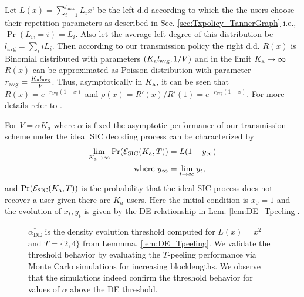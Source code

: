 
Let $L(x)=\sum_{i=1}^{l_{\max}} L_i x^i$ be the left d.d according to which the the users choose their repetition parameters as described in Sec. \ref{sec:Txpolicy_TannerGraph} i.e., $\Pr(L_{w}=i)=L_i$. Also let the average left degree of this distribution be $l_{\text{avg}}=\sum_i iL_i$. Then according to our transmission policy the right d.d. $R(x)$ is Binomial distributed with parameters $(K_{\text{a}} l_{\text{avg}},1/V)$  and in the limit $K_{\text{a}}\rightarrow \infty$ $R(x)$ can be approximated as Poisson distribution with parameter $r_{\text{avg}}=\frac{K_{\text{a}} l_{\text{avg}}}{V}$. Thus, asymptotically in $K_{\text{a}}$, it can be seen that $R(x)=e^{-r_{\text{avg}}(1-x)}$ and $\rho(x)=R'(x)/R'(1)=e^{-r_{\text{avg}}(1-x)}$. For more details refer to \cite{narayanan2012iterative}.

\begin{lemma} For $V=\alpha K_a$ where $\alpha$ is fixed the asymptotic performance of our transmission scheme under the ideal SIC decoding process can be characterized by %
\begin{align*}
\lim_{K_{\text{a}}\rightarrow \infty} \mathrm{Pr}(\mathcal{E}_{\text{SIC}}(K_{\text{a}},T))&=L(1-y_{\infty})\notag\\
\text{ where } y_{\infty} &=\lim_{t\rightarrow\infty} y_t,
\end{align*}
and $\mathrm{Pr}(\mathcal{E}_{\text{SIC}}(K_{\text{a}},T))$ is the probability that the ideal SIC process does not recover a user given there  are $K_a$ users. Here the initial condition is $x_0=1$ and the evolution of $x_t,y_t$ is given by the DE relationship in Lem. \ref{lem:DE_Tpeeling}.
\label{lem:asymptotic_SIC}
\end{lemma}

\begin{figure}[h!]
  \centering
  \resizebox{0.85\textwidth}{!}{}
  \caption{$\alpha^*_{\text{DE}}$ is the density evolution threshold computed for $L(x)=x^2$ and $T=\{2,4\}$ from Lemmma. \eqref{lem:DE_Tpeeling}. We validate the threshold behavior by evaluating the $T$-peeling performance via Monte Carlo simulations for increasing blocklengths. We observe that the simulations indeed confirm the threshold behavior for values of $\alpha$ above the DE threshold.}
  \label{fig:DEvBP}
\end{figure}

